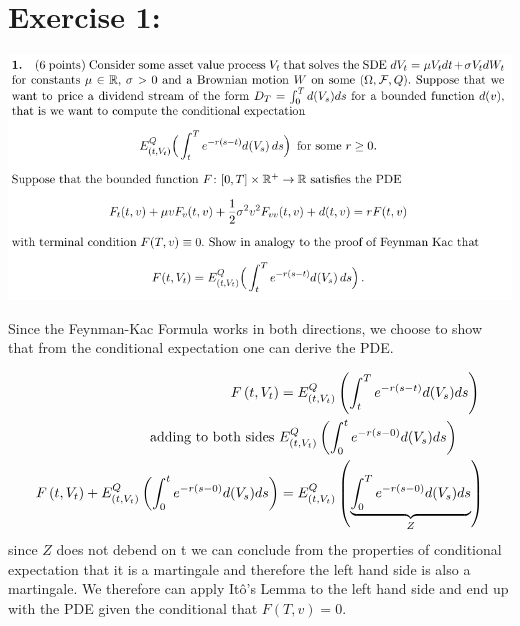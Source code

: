 \documentclass[document.tex]{subfiles}
\begin{document}
\section*{Exercise 1:}

\includegraphics[width=\textwidth]{ex1.png}

Since the Feynman-Kac Formula works in both directions,
we choose to show that from the conditional expectation one can
derive the PDE.

\begin{align*}
	F \left( t, V_t \right) &= E^Q_{\left( t, V_t \right)} \left( \int_t^T e^{-r(s-t)} d(V_s) ds \right) \\
	\text{adding to both sides } & E^Q_{\left( t, V_t \right)} \left( \int_0^t e^{-r(s-0)} d(V_s) ds \right)\\
F \left( t, V_t \right) + E^Q_{\left( t, V_t \right)} \left( \int_0^t e^{-r(s-0)} d(V_s) ds \right) &=
E^Q_{\left( t, V_t \right)} \left( \underbrace{\int_0^T e^{-r(s-0)} d(V_s) ds}_{Z} \right) 
\end{align*}
since $Z$ does not debend on t we can conclude from the properties of conditional expectation that
it is a martingale and therefore the left hand side is also a martingale.
We therefore can apply Itô's Lemma to the left hand side and end up with the PDE given the conditional
that $F(T,v)=0$.
\end{document}
